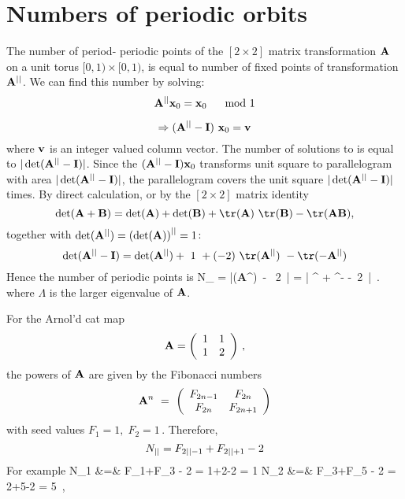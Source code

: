 \section{Numbers of periodic orbits}
\label{sect:NoPOs}



The number of period-\cl{} periodic points of the $[2\!\times\!2]$
matrix transformation ${\bf A}$ on a unit torus $[0,1)\times[0,1)$, is
equal to number of fixed points of transformation ${\bf A}^{||}$.
We can find this number by solving:
\begin{equation}
{\bf A}^{||}{\bf x}_0 = {\bf x}_0 \quad \mod 1
\label{RSCattyMap}
\end{equation}

$$ \Rightarrow ({\bf A}^\cl{} - {\bf I} )\ {\bf x}_0 = {\bf v}
$$
where ${\bf v } $ is an integer valued column vector.
The number of solutions to
is equal to $|\det({\bf A}^{||} - {\bf I} )|$. Since the $({\bf A}^{||} - {\bf I} ){\bf x}_0 $
transforms unit square to parallelogram with area
$|\det({\bf A}^{||} - {\bf I} )|$,
the parallelogram covers the unit square
$|\det({\bf A}^{||} - {\bf I} )|$ times.
By direct calculation, or by the $[2\!\times\!2]$  matrix identity
\[
\det( {\bf A} + {\bf B}  ) = \det({\bf A}) + \det( {\bf B} ) + \tr ({\bf A}) \ \tr ({\bf B}) - \tr ({\bf A} {\bf B}),
\]
together with $ \det({\bf A}^{||})=\left(\det({\bf A})\right)^{||} = 1 $:
$$\det( {\bf A}^\cl{} -{\bf I} )
= \det({\bf A}^\cl{}) + \ 1\ + (-2) \ \tr ({\bf A}^\cl{}) \   - \tr ( - {\bf A}^\cl{}) $$
Hence
the number of periodic points is
\beq
N_\cl{} =  |\tr ({\bf A}^\cl{})\ - \ 2\ |
 = | \Lambda^\cl{} + \Lambda^{-\cl{}} -\, 2\, |
 \,.
\label{RSNoPerPoints}
\eeq
where $\Lambda$ is the larger eigenvalue of ${\bf A}$.

For the Arnol'd cat map
\[
{\bf A}= \left (
		\begin{array}{cc}
		1&1\\
		1&2\\
		\end{array} \right)
\,,
\]
the powers of $ {\bf A}$ are given by the Fibonacci numbers
$${\bf A}^n\ = \ \left (
		\begin{array}{cc}
		F_{2n - 1}&F_{2n}\\
		F_{2n}&F_{2n+1}\\
		\end{array} \right)$$
with seed values  $ F_1 = 1,\; F_2 = 1 \,.$
Therefore,
$$ N_{||} =  F_{2{||} - 1}+F_{2{||}+1}  - 2 $$
For example
\bea
N_1 &=& F_{1}+F_{3}  - 2 = 1+2-2 = 1
\continue
N_2 &=& F_{3}+F_{5}  - 2 = 2+5-2 = 5
\,,\qquad \cdots
\label{RJN1N2}
\eea


